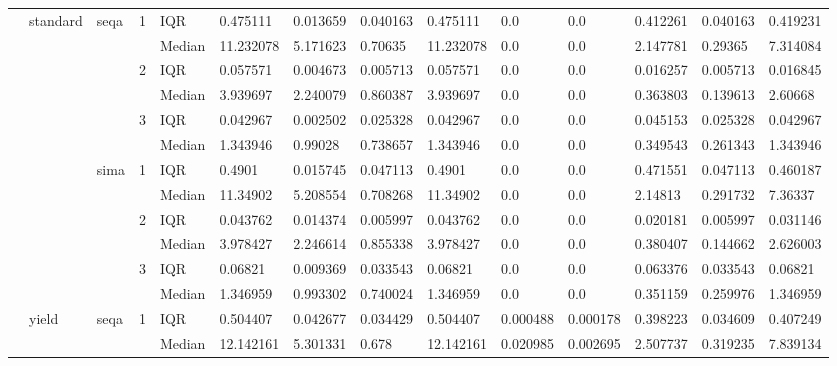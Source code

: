 \begin{tabular}{llllllllllllll}
    & standard & seqa & 1 & IQR &   0.475111 &   0.013659 &  0.040163 &   0.475111 &       0.0 &       0.0 &   0.412261 &  0.040163 &   0.419231 \\
    &       &      &   & Median &  11.232078 &   5.171623 &   0.70635 &  11.232078 &       0.0 &       0.0 &   2.147781 &   0.29365 &   7.314084 \\
    &       &      & 2 & IQR &   0.057571 &   0.004673 &  0.005713 &   0.057571 &       0.0 &       0.0 &   0.016257 &  0.005713 &   0.016845 \\
    &       &      &   & Median &   3.939697 &   2.240079 &  0.860387 &   3.939697 &       0.0 &       0.0 &   0.363803 &  0.139613 &    2.60668 \\
    &       &      & 3 & IQR &   0.042967 &   0.002502 &  0.025328 &   0.042967 &       0.0 &       0.0 &   0.045153 &  0.025328 &   0.042967 \\
    &       &      &   & Median &   1.343946 &    0.99028 &  0.738657 &   1.343946 &       0.0 &       0.0 &   0.349543 &  0.261343 &   1.343946 \\
    &       & sima & 1 & IQR &     0.4901 &   0.015745 &  0.047113 &     0.4901 &       0.0 &       0.0 &   0.471551 &  0.047113 &   0.460187 \\
    &       &      &   & Median &   11.34902 &   5.208554 &  0.708268 &   11.34902 &       0.0 &       0.0 &    2.14813 &  0.291732 &    7.36337 \\
    &       &      & 2 & IQR &   0.043762 &   0.014374 &  0.005997 &   0.043762 &       0.0 &       0.0 &   0.020181 &  0.005997 &   0.031146 \\
    &       &      &   & Median &   3.978427 &   2.246614 &  0.855338 &   3.978427 &       0.0 &       0.0 &   0.380407 &  0.144662 &   2.626003 \\
    &       &      & 3 & IQR &    0.06821 &   0.009369 &  0.033543 &    0.06821 &       0.0 &       0.0 &   0.063376 &  0.033543 &    0.06821 \\
    &       &      &   & Median &   1.346959 &   0.993302 &  0.740024 &   1.346959 &       0.0 &       0.0 &   0.351159 &  0.259976 &   1.346959 \\
    & yield & seqa & 1 & IQR &   0.504407 &   0.042677 &  0.034429 &   0.504407 &  0.000488 &  0.000178 &   0.398223 &  0.034609 &   0.407249 \\
    &       &      &   & Median &  12.142161 &   5.301331 &     0.678 &  12.142161 &  0.020985 &  0.002695 &   2.507737 &  0.319235 &   7.839134 \\

\end{tabular}
